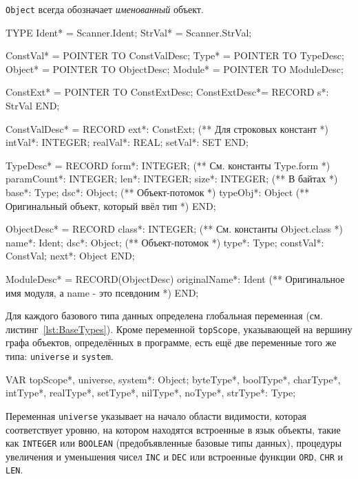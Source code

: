 \documentclass[utf8]{lgu}
\newcommand{\captionlisting}[1]{%
  \captionsetup{type=listing}%
  \captionof{listing}{#1}%
  \vspace{-11pt}%
}
\newcommand{\code}[1]{{\normalsize\texttt{#1}}}
\begin{document}
\code{Object} всегда обозначает \textit{именованный} объект.

\captionsetup{type=listing}
\captionlisting{Структура данных модуля Table}
\label{lst:TableTypes}
\begin{modula2long}
TYPE
  Ident* = Scanner.Ident;
  StrVal* = Scanner.StrVal;

  ConstVal* = POINTER TO ConstValDesc;
  Type* = POINTER TO TypeDesc;
  Object* = POINTER TO ObjectDesc;
  Module* = POINTER TO ModuleDesc;

  ConstExt* = POINTER TO ConstExtDesc;
  ConstExtDesc*= RECORD
    s*: StrVal
  END;
    
  ConstValDesc* = RECORD
    ext*: ConstExt; (** Для строковых констант *)
    intVal*: INTEGER;
    realVal*: REAL;
    setVal*: SET
  END;
    
  TypeDesc* = RECORD 
    form*: INTEGER; (** См. константы Type.form *)
    paramCount*: INTEGER;
    len*: INTEGER;
    size*: INTEGER; (** В байтах *)
    base*: Type;
    dsc*: Object; (** Объект-потомок *)
    typeObj*: Object (** Оригинальный объект,
                         который ввёл тип *)
  END;

  ObjectDesc* = RECORD
    class*: INTEGER; (** См. константы Object.class *)
    name*: Ident;
    dsc*: Object; (** Объект-потомок *)
    type*: Type;
    constVal*: ConstVal;
    next*: Object
  END;

  ModuleDesc* = RECORD(ObjectDesc)
    originalName*: Ident (** Оригинальное имя модуля,
                             а name - это псевдоним *)
  END;
\end{modula2long}

Для каждого базового типа данных определена глобальная переменная (см. листинг~\ref{lst:BaseTypes}). Кроме переменной \code{topScope}, указывающей на вершину графа объектов, определённых в программе, есть ещё две переменные того же типа: \code{universe} и \code{system}. 

\begin{listing}[H]
\caption{Глобальные переменные модуля Table}
\vspace{-17pt}
\label{lst:BaseTypes}
\begin{modula2}
VAR topScope*, universe, system*: Object;
  byteType*, boolType*, charType*, intType*, realType*,
    setType*, nilType*, noType*, strType*: Type;
\end{modula2}
\end{listing}

Переменная \code{universe} указывает на начало области видимости, которая соответствует уровню, на котором находятся встроенные в язык объекты, такие как \code{INTEGER} или \code{BOOLEAN} (предобъявленные базовые типы данных), процедуры увеличения и уменьшения чисел \code{INC} и \code{DEC} или встроенные функции \code{ORD}, \code{CHR} и \code{LEN}.
\end{document}

